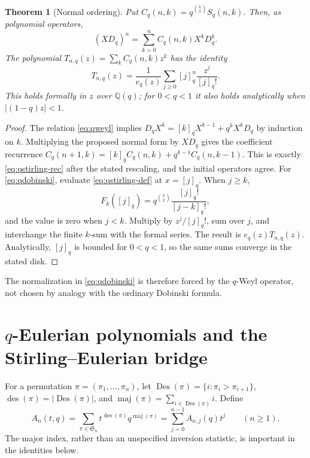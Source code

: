 \documentclass[11pt,a4paper]{article}
\numberwithin{equation}{section}
\newtheorem{theorem}{Theorem}[section]
\theoremstyle{definition}
\theoremstyle{remark}
\newcommand{\Q}{\mathbb Q}
\newcommand{\qnum}[1]{[#1]_q}
\newcommand{\qfac}[1]{[#1]_q!}
\newcommand{\des}{\operatorname{des}}
\newcommand{\maj}{\operatorname{maj}}
\begin{document}
\begin{theorem}[Normal ordering]
\label{thm:normal-order}
Put $C_q(n,k)=q^{\binom k2}S_q(n,k)$. Then, as polynomial operators,
\begin{equation}
 (XD_q)^n=\sum_{k=0}^n C_q(n,k)X^kD_q^k.
 \label{eq:normal-order}
\end{equation}
The polynomial $T_{n,q}(z)=\sum_kC_q(n,k)z^k$ has the identity
\begin{equation}
 T_{n,q}(z)=\frac1{e_q(z)}
       \sum_{j\ge0}\qnum j^n\frac{z^j}{\qfac j}.
 \label{eq:qdobinski}
\end{equation}
This holds formally in $z$ over $\Q(q)$; for $0<q<1$ it also holds
analytically when $|(1-q)z|<1$.
\end{theorem}
\begin{proof}
The relation \cref{eq:qweyl} implies
$D_qX^k=\qnum k X^{k-1}+q^kX^kD_q$ by induction on $k$.
Multiplying the proposed normal form by $XD_q$ gives the coefficient
recurrence
$C_q(n+1,k)=\qnum kC_q(n,k)+q^{k-1}C_q(n,k-1)$.
This is exactly \cref{eq:qstirling-rec} after the stated rescaling,
and the initial operators agree.
For \cref{eq:qdobinski}, evaluate \cref{eq:qstirling-def} at $x=\qnum j$.
When $j\ge k$,
\[
 F_k(\qnum j)=q^{\binom k2}\frac{\qfac j}{\qfac{j-k}},
\]
and the value is zero when $j<k$. Multiply by $z^j/\qfac j$, sum over
$j$, and interchange the finite $k$-sum with the formal series. The
result is $e_q(z)T_{n,q}(z)$. Analytically, $\qnum j$ is bounded for
$0<q<1$, so the same sums converge in the stated disk.
\end{proof}
The normalization in \cref{eq:qdobinski} is therefore forced by the
$q$-Weyl operator, not chosen by analogy with the ordinary Dobinski formula.

\section{\texorpdfstring{$q$}{q}-Eulerian polynomials and the Stirling--Eulerian bridge}
\label{sec:eulerian}
For a permutation $\pi=(\pi_1,\ldots,\pi_n)$, let
$\operatorname{Des}(\pi)=\{i:\pi_i>\pi_{i+1}\}$,
$\des(\pi)=|\operatorname{Des}(\pi)|$, and
$\maj(\pi)=\sum_{i\in\operatorname{Des}(\pi)}i$. Define
\begin{equation}
 A_n(t,q)=\sum_{\pi\in\mathfrak S_n}t^{\des(\pi)}q^{\maj(\pi)}
       =\sum_{j=0}^{n-1}A_{n,j}(q)t^j \qquad(n\ge1).
 \label{eq:qeulerian}
\end{equation}
The major index, rather than an unspecified inversion statistic, is
important in the identities below.
\end{document}
